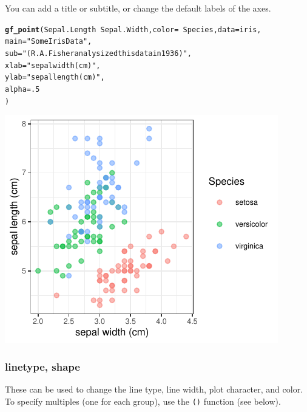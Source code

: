 \documentclass[twoside]{book}\usepackage[]{graphicx}\usepackage[]{xcolor}
\makeatletter
\def\maxwidth{ %
  \ifdim\Gin@nat@width>\linewidth
    \linewidth
  \else
    \Gin@nat@width
  \fi
}
\newcommand{\hlnum}[1]{\textcolor[rgb]{0.686,0.059,0.569}{#1}}%
\newcommand{\hlstr}[1]{\textcolor[rgb]{0.192,0.494,0.8}{#1}}%
\newcommand{\hlopt}[1]{\textcolor[rgb]{0,0,0}{#1}}%
\newcommand{\hlstd}[1]{\textcolor[rgb]{0.345,0.345,0.345}{#1}}%
\newcommand{\hlkwc}[1]{\textcolor[rgb]{0.333,0.667,0.333}{#1}}%
\newcommand{\hlkwd}[1]{\textcolor[rgb]{0.737,0.353,0.396}{\textbf{#1}}}%
\newenvironment{kframe}{%
 \def\at@end@of@kframe{}%
 \ifinner\ifhmode%
  \def\at@end@of@kframe{\end{minipage}}%
  \begin{minipage}{\columnwidth}%
 \fi\fi%
 \def\FrameCommand##1{\hskip\@totalleftmargin \hskip-\fboxsep
 \colorbox{shadecolor}{##1}\hskip-\fboxsep
     \hskip-\linewidth \hskip-\@totalleftmargin \hskip\columnwidth}%
 \MakeFramed {\advance\hsize-\width
   \@totalleftmargin\z@ \linewidth\hsize
   \@setminipage}}%
 {\par\unskip\endMakeFramed%
 \at@end@of@kframe}
\newenvironment{knitrout}{}{} %
\newcommand{\Rindex}[1]{\index{\texttt{#1}}}
\newcommand{\function}[1]{{\color{purple!75!blue}\texttt{\StrSubstitute{#1}{()}{}()}}\Rindex{#1}}
\makeatother
\begin{document}
You can add a title or subtitle, or change the default labels of the axes.
\begin{knitrout}
\color{fgcolor}\begin{kframe}
\begin{alltt}
\hlkwd{gf_point}\hlstd{(Sepal.Length} \hlopt{~} \hlstd{Sepal.Width,} \hlkwc{color} \hlstd{=} \hlopt{~}\hlstd{Species,} \hlkwc{data} \hlstd{= iris,}
        \hlkwc{main} \hlstd{=} \hlstr{"Some Iris Data"}\hlstd{,}
        \hlkwc{sub} \hlstd{=} \hlstr{"(R. A. Fisher analysized this data in 1936)"}\hlstd{,}
        \hlkwc{xlab} \hlstd{=} \hlstr{"sepal width (cm)"}\hlstd{,}
        \hlkwc{ylab} \hlstd{=} \hlstr{"sepal length (cm)"}\hlstd{,}
        \hlkwc{alpha} \hlstd{=} \hlnum{.5}
\hlstd{)}
\end{alltt}
\end{kframe}

{\centering \includegraphics[width=\maxwidth]{figures/fig-iris-xyplot-text-1} 

}



\end{knitrout}


\subsubsection*{linetype, shape}
These can be used to change the line type, line width, plot character, and
color.  To specify multiples (one for each group), use the \function{c()} function 
(see below).
\end{document}
